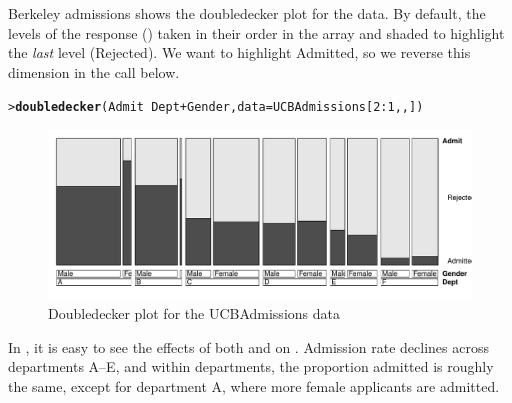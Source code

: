 \documentclass[10pt,krantz2]{krantz}\usepackage[]{graphicx}\usepackage[]{color}
\makeatletter
\newcommand{\hlnum}[1]{\textcolor[rgb]{0.686,0.059,0.569}{#1}}%
\newcommand{\hlopt}[1]{\textcolor[rgb]{0,0,0}{#1}}%
\newcommand{\hlstd}[1]{\textcolor[rgb]{0.345,0.345,0.345}{#1}}%
\newcommand{\hlkwc}[1]{\textcolor[rgb]{0.333,0.667,0.333}{#1}}%
\newcommand{\hlkwd}[1]{\textcolor[rgb]{0.737,0.353,0.396}{\textbf{#1}}}%
\newenvironment{kframe}{%
 \def\at@end@of@kframe{}%
 \ifinner\ifhmode%
  \def\at@end@of@kframe{\end{minipage}}%
  \begin{minipage}{\columnwidth}%
 \fi\fi%
 \def\FrameCommand##1{\hskip\@totalleftmargin \hskip-\fboxsep
 \colorbox{shadecolor}{##1}\hskip-\fboxsep
     \hskip-\linewidth \hskip-\@totalleftmargin \hskip\columnwidth}%
 \MakeFramed {\advance\hsize-\width
   \@totalleftmargin\z@ \linewidth\hsize
   \@setminipage}}%
 {\par\unskip\endMakeFramed%
 \at@end@of@kframe}
\newenvironment{knitrout}{}{} %
\renewenvironment{knitrout}{\small\renewcommand{\baselinestretch}{.85}}{} %
\makeatother
\begin{document}
\begin{Example}{Berkeley admissions}
 shows the doubledecker plot for the  data.
By default, the levels of the response () taken in their order in the array and
shaded to highlight the \emph{last} level (Rejected). We want to highlight Admitted, so we reverse
this dimension in the call below.
\begin{knitrout}
\color{fgcolor}\begin{kframe}
\begin{alltt}
\hlstd{> }\hlkwd{doubledecker}\hlstd{(Admit} \hlopt{~} \hlstd{Dept} \hlopt{+} \hlstd{Gender,} \hlkwc{data}\hlstd{=UCBAdmissions[}\hlnum{2}\hlopt{:}\hlnum{1}\hlstd{,,])}
\end{alltt}
\end{kframe}\begin{figure}[!htbp]

\centerline{\includegraphics[width=\textwidth]{ch05/fig/berkeley-doubledecker-1} }

\caption[Doubledecker plot for the UCBAdmissions data]{Doubledecker plot for the UCBAdmissions data}\label{fig:berkeley-doubledecker}
\end{figure}


\end{knitrout}
In , it is easy to see the effects of both  and  on 
. Admission rate declines across departments A--E, and within departments, the 
proportion admitted is roughly the same, except for department A, where more female applicants
are admitted.
\end{Example}
\end{document}
